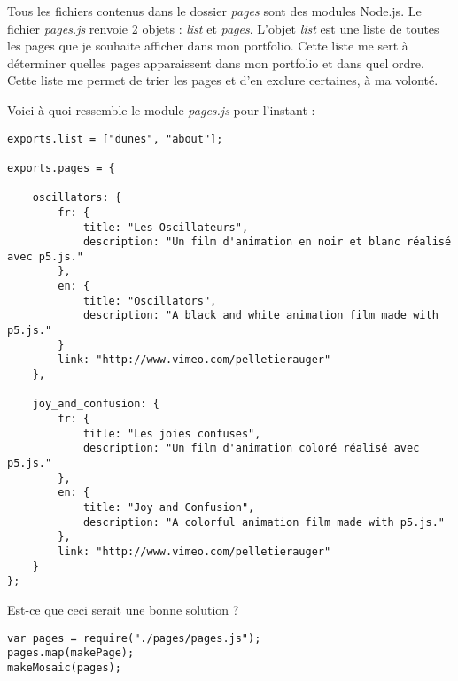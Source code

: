 Tous les fichiers contenus dans le dossier \textit{pages} sont des modules Node.js. Le fichier \textit{pages.js} renvoie 2 objets : \textit{list} et \textit{pages}. L'objet \textit{list} est une liste de toutes les pages que je souhaite afficher dans mon portfolio. Cette liste me sert à déterminer quelles pages apparaissent dans mon portfolio et dans quel ordre. Cette liste me permet de trier les pages et d'en exclure certaines, à ma volonté.

Voici à quoi ressemble le module \textit{pages.js} pour l'instant :

\begin{lstlisting}
exports.list = ["dunes", "about"];

exports.pages = {

    oscillators: {
        fr: {
            title: "Les Oscillateurs",
            description: "Un film d'animation en noir et blanc réalisé avec p5.js."
        },
        en: {
            title: "Oscillators",
            description: "A black and white animation film made with p5.js."
        }
        link: "http://www.vimeo.com/pelletierauger"
    },

    joy_and_confusion: {
        fr: {
            title: "Les joies confuses",
            description: "Un film d'animation coloré réalisé avec p5.js."
        },
        en: {
            title: "Joy and Confusion",
            description: "A colorful animation film made with p5.js."
        },
        link: "http://www.vimeo.com/pelletierauger"
    }
};
\end{lstlisting}

\clearpage
Est-ce que ceci serait une bonne solution ? 

\begin{lstlisting}
var pages = require("./pages/pages.js");
pages.map(makePage);
makeMosaic(pages);
\end{lstlisting}
